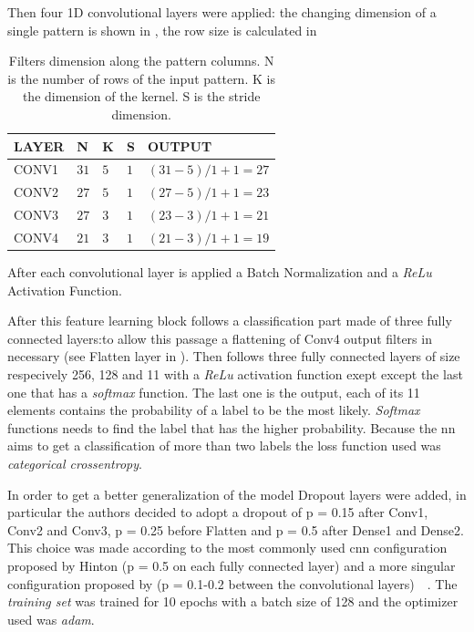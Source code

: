 Then four 1D convolutional layers were applied: the changing dimension of a single pattern is shown in , the row size is calculated in 

\begin{table}[htp]
\small
	\centering
		\renewcommand{\arraystretch}{1}%
	\begin{tabular}{@{}lllll@{}}
	\toprule
	LAYER & N & K & S & OUTPUT\\
	\midrule
	CONV1 & $31$ & $5$ & $1$ & $(31-5)/1+1 = 27$\\
	CONV2 & $27$ & $5$ & $1$ & $(27-5)/1+1 = 23$\\
	CONV3 & $27$ & $3$ & $1$ & $(23-3)/1+1 = 21$\\
	CONV4 & $21$ & $3$ & $1$ & $(21-3)/1+1 = 19$\\
	\bottomrule
	\end{tabular}
	\caption{Filters dimension along the pattern columns. N is the number of rows of the input pattern. K is the dimension of the kernel. S is the stride dimension.}
	\label{tab:filtersize}
\end{table}

After each convolutional layer is applied a Batch Normalization and a \textit{ReLu} Activation Function.

After this feature learning block follows a classification part made of three fully connected layers:to allow this passage a flattening of Conv4 output filters in necessary (see Flatten layer in ). Then follows three fully connected layers of size respecively 256, 128 and 11 with a \textit{ReLu} activation function exept except the last one that has a \textit{softmax} function. The last one is the output, each of its 11 elements contains the probability of a label to be the most likely. \textit{Softmax} functions needs to find the label that has the higher probability. Because the \gls{nn} aims to get a classification of more than two labels the loss function used was \textit{categorical crossentropy}.

In order to get a better generalization of the model Dropout layers were added, in particular the authors decided to adopt a dropout of p = 0.15 after Conv1, Conv2 and Conv3, p = 0.25 before Flatten and p = 0.5 after Dense1 and Dense2. This choice was made according to the most commonly used \gls{cnn} configuration proposed by Hinton (p = 0.5 on each fully connected layer) and a more singular configuration proposed by  (p = 0.1-0.2 between the convolutional layers)~\cite{Hinton12}~\cite{Sungheon17}.
The \textit{training set} was trained for 10 epochs with a batch size of 128 and the optimizer used was \textit{adam}. 





